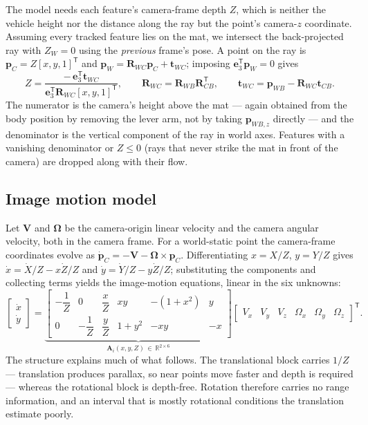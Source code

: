\documentclass[10pt]{article}
\newcommand{\R}{\mathbf{R}}
\newcommand{\vt}[1]{\mathbf{#1}}
\newcommand{\Rwb}{\R_{WB}}
\newcommand{\Rwc}{\R_{WC}}
\newcommand{\Rcb}{\R_{CB}}
\begin{document}
The model needs each feature's camera-frame depth $Z$, which is neither the vehicle height nor the
distance along the ray but the point's camera-$z$ coordinate. Assuming every tracked feature lies on
the mat, we intersect the back-projected ray with $Z_W=0$ using the \emph{previous} frame's pose. A
point on the ray is $\vt{p}_C = Z[x,y,1]^{\mathsf T}$ and $\vt{p}_W = \Rwc\vt{p}_C+\vt{t}_{WC}$;
imposing $\vt{e}_3^{\mathsf T}\vt{p}_W=0$ gives
\begin{equation}
Z = \frac{-\,\vt{e}_3^{\mathsf T}\vt{t}_{WC}}{\vt{e}_3^{\mathsf T}\Rwc[x,y,1]^{\mathsf T}},
\qquad
\Rwc = \Rwb\Rcb^{\mathsf T},\qquad
\vt{t}_{WC} = \vt{p}_{WB}-\Rwc\vt{t}_{CB}.
\end{equation}
The numerator is the camera's height above the mat --- again obtained from the body position by
removing the lever arm, not by taking $\vt{p}_{WB,z}$ directly --- and the denominator is the
vertical component of the ray in world axes. Features with a vanishing denominator or $Z\le0$ (rays
that never strike the mat in front of the camera) are dropped along with their flow.

\subsection{Image motion model}

Let $\vt{V}$ and $\bm{\Omega}$ be the camera-origin linear velocity and the camera angular velocity,
both in the camera frame. For a world-static point the camera-frame coordinates evolve as
$\dot{\vt{p}}_C = -\vt{V}-\bm{\Omega}\times\vt{p}_C$. Differentiating $x=X/Z$, $y=Y/Z$ gives $\dot x
= \dot X/Z - x\dot Z/Z$ and $\dot y = \dot Y/Z - y\dot Z/Z$; substituting the components and
collecting terms yields the image-motion equations, linear in the six unknowns:
\begin{equation}
\begin{bmatrix}\dot{x}\\[1pt]\dot{y}\end{bmatrix}
=
\underbrace{\begin{bmatrix}
-\dfrac{1}{Z} & 0 & \dfrac{x}{Z} & xy & -(1+x^{2}) & y\\[7pt]
0 & -\dfrac{1}{Z} & \dfrac{y}{Z} & 1+y^{2} & -xy & -x
\end{bmatrix}}_{\mathbf{A}_i(x,y,Z)\,\in\,\mathbb{R}^{2\times6}}
\begin{bmatrix}V_x & V_y & V_z & \Omega_x & \Omega_y & \Omega_z\end{bmatrix}^{\mathsf T}.
\label{eq:flowmodel}
\end{equation}
The structure explains much of what follows. The translational block carries $1/Z$ --- translation
produces parallax, so near points move faster and depth is required --- whereas the rotational block
is depth-free. Rotation therefore carries no range information, and an interval that is mostly
rotational conditions the translation estimate poorly.
\end{document}
